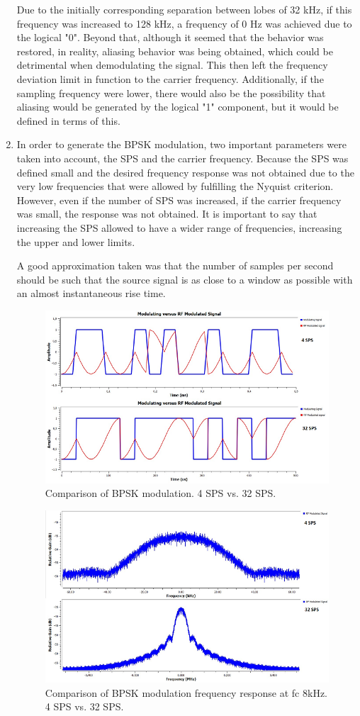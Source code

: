 \documentclass{journal}[IEEEtran, twocolumn]             %
\begin{document}
\begin{multicols}{2}
\begin{enumerate}[label=\Alph*]
    Due to the initially corresponding separation between lobes of 32 kHz, if this frequency was increased to 128 kHz, a frequency of 0 Hz was achieved due to the logical "0". Beyond that, although it seemed that the behavior was restored, in reality, aliasing behavior was being obtained, which could be detrimental when demodulating the signal. This then left the frequency deviation limit in function to the carrier frequency. Additionally, if the sampling frequency were lower, there would also be the possibility that aliasing would be generated by the logical "1" component, but it would be defined in terms of this.

    \item In order to generate the BPSK modulation, two important parameters were taken into account, the SPS and the carrier frequency. Because the SPS was defined small and the desired frequency response was not obtained due to the very low frequencies that were allowed by fulfilling the Nyquist criterion. However, even if the number of SPS was increased, if the carrier frequency was small, the response was not obtained. It is important to say that increasing the SPS allowed to have a wider range of frequencies, increasing the upper and lower limits.

    A good approximation taken was that the number of samples per second should be such that the source signal is as close to a window as possible with an almost instantaneous rise time.

    \begin{figure}[H]
    \centering
        \centering
        \includegraphics[width=0.6\columnwidth]{figs/PT_2_D_time.png}
    \caption{Comparison of BPSK modulation. 4 SPS vs. 32 SPS.}
    \label{pt_2_d}
    \end{figure}

    \begin{figure}[H]
    \centering
        \centering
        \includegraphics[width=0.6\columnwidth]{figs/PT_2_D_FREQ.png}
    \caption{Comparison of BPSK modulation frequency response at fc 8kHz. 4 SPS vs. 32 SPS.}
    \label{pt_2_d_freq}
    \end{figure}
    

\end{enumerate}
\end{multicols}
\end{document}
